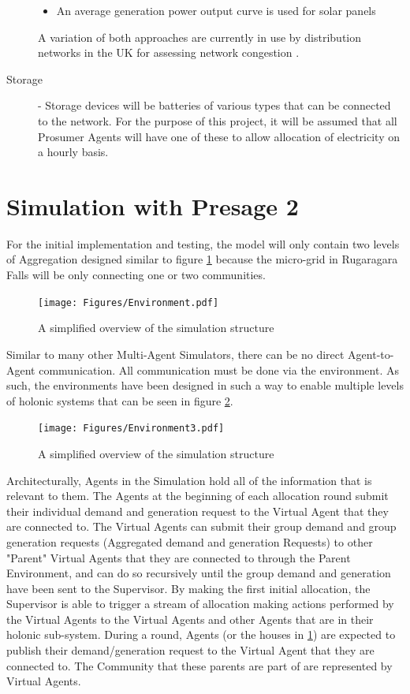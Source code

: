 \begin{description}
\begin{itemize}
  \item An average generation power output curve is used for solar panels

\end{itemize}

A variation of both approaches are currently in use by distribution networks in the UK for assessing network congestion \cite{IPSA-web-constraint:2015}.

\item[Storage] - Storage devices will be batteries of various types that can be connected to the network. For the purpose of this project, it will be assumed that all Prosumer Agents will have one of these to allow allocation of electricity on a hourly basis.
\end{description}

\section*{Simulation with Presage 2}
For the initial implementation and testing, the model will only contain two levels of Aggregation designed similar to figure \ref{fig:SimEnv} because the micro-grid in Rugaragara Falls will be only connecting one or two communities. 

\begin{figure}[h!]
	\centering
	\texttt{[image: Figures/Environment.pdf]}
	\caption{A simplified overview of the simulation structure}
	\label{fig:SimEnv}
\end{figure}

Similar to many other Multi-Agent Simulators, there can be no direct Agent-to-Agent communication. All communication must be done via the environment. As such, the environments have been designed in such a way to enable multiple levels of holonic systems that can be seen in figure \ref{fig:SimEnv2}. 

\begin{figure}[h!]
	\centering
	\texttt{[image: Figures/Environment3.pdf]}
	\caption{A simplified overview of the simulation structure}
	\label{fig:SimEnv2}
\end{figure}

Architecturally, Agents in the Simulation hold all of the information that is relevant to them. The Agents at the beginning of each allocation round submit their individual demand and generation request to the Virtual Agent that they are connected to. The Virtual Agents can submit their group demand and group generation requests (Aggregated demand and generation Requests) to other "Parent" Virtual Agents that they are connected to through the Parent Environment, and can do so recursively until the group demand and generation have been sent to the Supervisor. By making the first initial allocation, the Supervisor is able to trigger a stream of allocation making actions performed by the Virtual Agents to the Virtual Agents and other Agents that are in their holonic sub-system.
During a round, Agents (or the houses in \ref{fig:SimEnv}) are expected to publish their demand/generation request to the Virtual Agent that they are connected to. The Community that these parents are part of are represented by Virtual Agents. 

